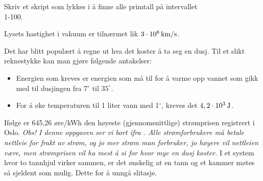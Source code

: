 Skriv et skript som lykkes i å finne alle primtall på intervallet\\ 1-100.

\newpage


\newpage
{}
Lysets hastighet i vakuum er tilnærmet lik $ 3\cdot10^8\,\textrm{km/s} $.


Det har blitt populært å regne ut hva det koster å ta seg en dusj. Til et slikt reknestykke kan man gjøre følgende antakelser:
\begin{itemize}
	\item Energien som kreves er energien som må til for å varme opp vannet som gikk med til dusjingen fra 7$^\circ $ til $ 35^\circ $.
	\item For å øke temperaturen til 1 liter vann med 1$ ^\circ $, kreves det $ 4,2\cdot10^3\,\textrm{J} $.
\end{itemize}
Ifølge  er 645,26 øre/kWh den høyeste (gjennomsnittlige) strømprisen registrert i Oslo. 
\textit{\small Obs! I denne oppgaven ser vi bort ifra . Alle strømforbrukere må betale nettleie for frakt av strøm, og jo mer strøm man forbruker, jo høyere vil nettleien være, men strømprisen vil ha mest å si for hvor mye en dusj koster.}
\newpage
{}
I et system hvor to tannhjul virker sammen, er det ønskelig at en tann og et kammer møtes så sjeldent som mulig. Dette for å unngå slitasje. \vsk

